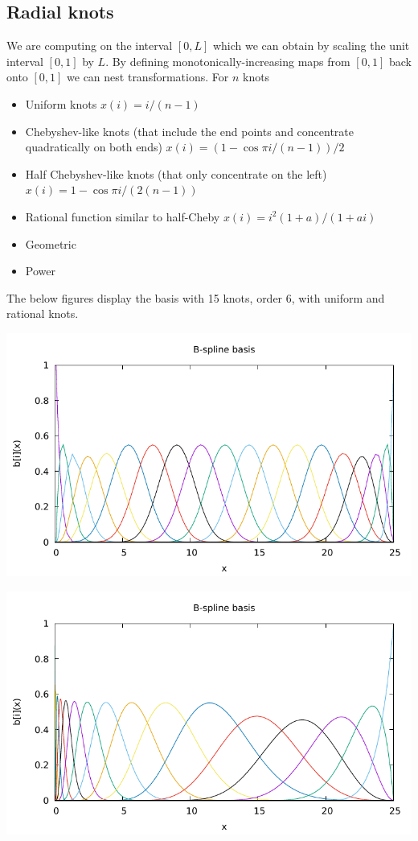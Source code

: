 \documentclass[12pt]{article}
\begin{document}
\subsection{Radial knots}

We are computing on the interval $[0,L]$ which we can obtain by scaling the unit interval $[0,1]$ by $L$.  By defining monotonically-increasing maps from $[0,1]$ back onto $[0,1]$ we can nest transformations.    For $n$ knots
\begin{itemize}
\item Uniform knots $x(i) = i/(n-1)$
\item Chebyshev-like knots (that include the end points and concentrate quadratically on both ends) $x(i) = (1-\cos \pi i / (n-1))/2$
\item Half Chebyshev-like knots (that only concentrate on the left) $x(i) = 1 - \cos \pi i / (2(n-1))$
\item Rational function similar to half-Cheby $x(i) = i^2 (1+a) / (1 + ai)$
\item Geometric
\item Power
\end{itemize}

The below figures display the basis with 15 knots, order 6, with uniform and rational knots.

\includegraphics[width=.9\linewidth]{basis.pdf}

\includegraphics[width=.9\linewidth]{basis-non-uni.pdf}
\end{document}

